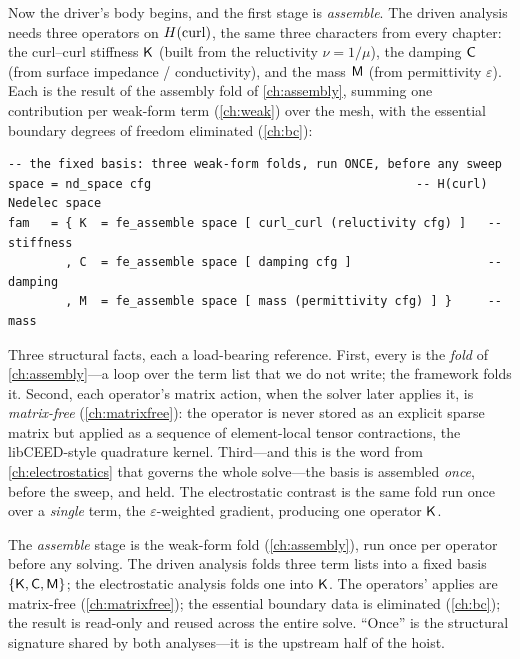 Now the driver's body begins, and the first stage is \emph{assemble}. The driven
analysis needs three operators on $H(\mathrm{curl})$, the same three characters from every
chapter: the curl--curl stiffness $\mathsf{K}$ (built from the reluctivity $\nu=1/\mu$),
the damping $\mathsf{C}$ (from surface impedance / conductivity), and the mass $\mathsf{M}$
(from permittivity $\varepsilon$). Each is the result of the assembly fold
 of \cref{ch:assembly}, summing one contribution per weak-form
term (\cref{ch:weak}) over the mesh, with the essential boundary degrees of
freedom eliminated (\cref{ch:bc}):
\begin{lstlisting}[style=l4style]
-- the fixed basis: three weak-form folds, run ONCE, before any sweep
space = nd_space cfg                                     -- H(curl) Nedelec space
fam   = { K  = fe_assemble space [ curl_curl (reluctivity cfg) ]   -- stiffness
        , C  = fe_assemble space [ damping cfg ]                   -- damping
        , M  = fe_assemble space [ mass (permittivity cfg) ] }     -- mass
\end{lstlisting}
Three structural facts, each a load-bearing reference. First, every
 is the \emph{fold} of \cref{ch:assembly}---a loop over the term
list that we do not write; the framework folds it. Second, each operator's matrix
action, when the solver later applies it, is \emph{matrix-free}
(\cref{ch:matrixfree}): the operator is never stored as an explicit sparse matrix
but applied as a sequence of element-local tensor contractions, the libCEED-style
quadrature kernel. Third---and this is the word from \cref{ch:electrostatics} that
governs the whole solve---the basis is assembled \emph{once}, before the sweep, and
held. The electrostatic contrast is the same fold run once over a \emph{single}
term, the $\varepsilon$-weighted gradient, producing one operator $\mathsf{K}$.

\begin{keyidea}
The \emph{assemble} stage is the weak-form fold 
(\cref{ch:assembly}), run once per operator before any solving. The driven
analysis folds three term lists into a fixed basis $\{\mathsf{K},\mathsf{C},\mathsf{M}\}$; the
electrostatic analysis folds one into $\mathsf{K}$. The operators' applies are
matrix-free (\cref{ch:matrixfree}); the essential boundary data is eliminated
(\cref{ch:bc}); the result is read-only and reused across the entire solve. ``Once''
is the structural signature shared by both analyses---it is the upstream half of
the hoist.
\end{keyidea}

